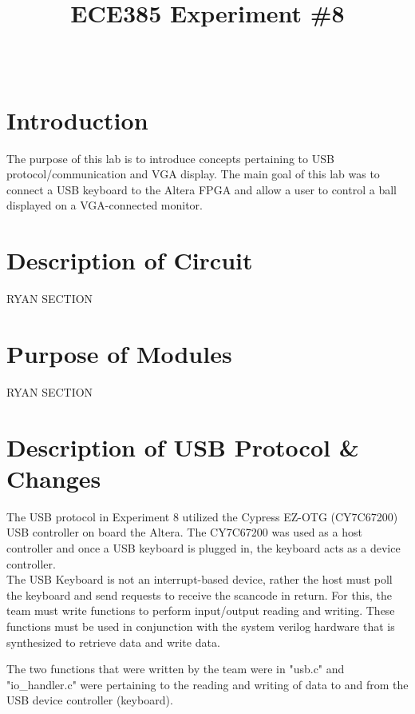 \documentclass[journal, twocolumn, final,11pt,letterpaper]{IEEEtran}
\title{ECE385 Experiment \#8
	}
\author{
\IEEEauthorblockN{Eric Meyers, Ryan Helsdingen}\\
\IEEEauthorblockA{Section ABG; TAs: Ben Delay, Shuo Liu \\
March 30th, 2016 \\
emeyer7, helsdin2}}
\begin{document}
	
\maketitle
\singlespacing

\section{Introduction}
The purpose of this lab is to introduce concepts pertaining to USB protocol/communication and VGA display. The main goal of this lab was to connect a USB keyboard to the Altera FPGA and allow a user to control a ball displayed on a VGA-connected monitor.

\section{Description of Circuit}
RYAN SECTION

\section{Purpose of Modules}
RYAN SECTION

\section{Description of USB Protocol \& Changes}
The USB protocol in Experiment 8 utilized the Cypress EZ-OTG (CY7C67200) USB controller on board the Altera. The CY7C67200 was used as a host controller and once a USB keyboard is plugged in, the keyboard acts as a device controller.\\

The USB Keyboard is not an interrupt-based device, rather the host must poll the keyboard and send requests to receive the scancode in return. For this, the team must write functions to perform input/output reading and writing. These functions must be used in conjunction with the system verilog hardware that is synthesized to retrieve data and write data. 

The two functions that were written by the team were in "usb.c" and "io\_handler.c" were pertaining to the reading and writing of data to and from the USB device controller (keyboard).\\
\end{document}
